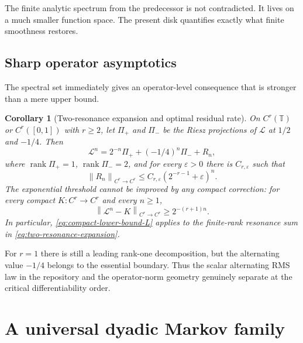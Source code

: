 \documentclass[11pt,a4paper]{article}
\newtheorem{corollary}[theorem]{Corollary}
\theoremstyle{definition}
\theoremstyle{remark}
\newcommand{\T}{\mathbb T}
\newcommand{\norm}[1]{\left\lVert #1\right\rVert}
\newcommand{\Lop}{\mathcal L}
\begin{document}
The finite analytic spectrum from the predecessor is not contradicted.  It
lives on a much smaller function space.  The present disk quantifies exactly
what finite smoothness restores.

\subsection{Sharp operator asymptotics}
The spectral set immediately gives an operator-level consequence that is
stronger than a mere upper bound.

\begin{corollary}[Two-resonance expansion and optimal residual rate]
\label{cor:asymptotic}
On $C^r(\T)$ or $C^r([0,1])$ with $r\ge2$, let $\Pi_+$ and $\Pi_-$ be the
Riesz projections of $\Lop$ at $1/2$ and $-1/4$.  Then
\begin{equation}
 \Lop^n=2^{-n}\Pi_+ +(-1/4)^n\Pi_-+R_n,
 \label{eq:two-resonance-expansion}
\end{equation}
where $\operatorname{rank}\Pi_+=1$, $\operatorname{rank}\Pi_-=2$, and for
every $\varepsilon>0$ there is $C_{r,\varepsilon}$ such that
\begin{equation}
 \norm{R_n}_{C^r\to C^r}
 \le C_{r,\varepsilon}(2^{-r-1}+\varepsilon)^n.
 \label{eq:upper-residual}
\end{equation}
The exponential threshold cannot be improved by any compact correction:
for every compact $K:C^r\to C^r$ and every $n\ge1$,
\begin{equation}
 \norm{\Lop^n-K}_{C^r\to C^r}\ge 2^{-(r+1)n}.
 \label{eq:compact-lower-bound-L}
\end{equation}
In particular, \eqref{eq:compact-lower-bound-L} applies to the finite-rank
resonance sum in \eqref{eq:two-resonance-expansion}.
\end{corollary}

For $r=1$ there is still a leading rank-one decomposition, but the alternating
value $-1/4$ belongs to the essential boundary.  Thus the scalar alternating
RMS law in the repository and the operator-norm geometry genuinely separate
at the critical differentiability order.

\section{A universal dyadic Markov family}
\label{sec:general-family}
\end{document}
